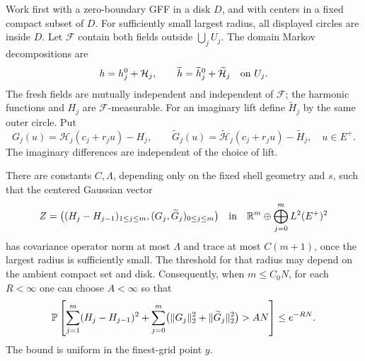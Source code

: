 Work first with a zero-boundary GFF in a disk \(D\), and with
centers in a fixed compact subset of \(D\).  For sufficiently small
largest radius, all displayed circles are inside \(D\).
Let \(\mathcal F\) contain both fields outside \(\bigcup_jU_j\).
The domain Markov decompositions are
\[
 h=h_j^0+\mathcal H_j,\qquad
 \widetilde h=\widetilde h_j^0+\widetilde{\mathcal H}_j
 \quad\hbox{on }U_j.
\]
The fresh fields are mutually independent and independent of
\(\mathcal F\); the harmonic functions and \(H_j\) are
\(\mathcal F\)-measurable.  For an imaginary lift define
\(\widetilde H_j\) by the same outer circle.  Put
\[
 G_j(u)=\mathcal H_j(c_j+r_ju)-H_j,\qquad
 \widetilde G_j(u)=
   \widetilde{\mathcal H}_j(c_j+r_ju)-\widetilde H_j,
 \quad u\in E^+.
\]
The imaginary differences are independent of the choice of lift.

\begin{lemma}\label{ann:gaussian-budget}
There are constants \(C,\Lambda\), depending only on the fixed
shell geometry and \(s\), such that the centered Gaussian vector
\[
 Z=\bigl((H_j-H_{j-1})_{1\le j\le m},
              (G_j,\widetilde G_j)_{0\le j\le m}\bigr)
 \quad\hbox{in}\quad
 \mathbb R^m\oplus\bigoplus_{j=0}^m L^2(E^+)^2
\]
has covariance operator norm at most \(\Lambda\) and trace at most
\(C(m+1)\), once the largest radius is sufficiently small.
The threshold for that radius may depend on the ambient compact set
and disk.  Consequently, when \(m\le C_0N\), for each \(R<\infty\)
one can choose \(A<\infty\) so that
\begin{equation}
 \PP\left[
  \sum_{j=1}^m(H_j-H_{j-1})^2+
  \sum_{j=0}^m\bigl(\|G_j\|_2^2+\|\widetilde G_j\|_2^2\bigr)
       >AN\right]\le e^{-RN}.
 \label{ann:square-tail}
\end{equation}
The bound is uniform in the finest-grid point \(y\).
\end{lemma}

